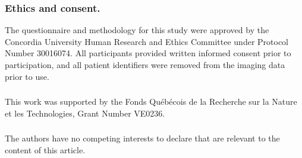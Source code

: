 \documentclass[runningheads]{llncs}
\begin{document}
\subsubsection*{Ethics and consent.}
The questionnaire and methodology for this study were approved by the
Concordia University Human Research and Ethics Committee under Protocol
Number 30016074. All participants provided written informed consent prior to
participation, and all patient identifiers were removed from the imaging data
prior to use.

\begin{credits}
\subsubsection{\ackname}
This work was supported by the Fonds Qu\'eb\'ecois de la Recherche sur la
Nature et les Technologies, Grant Number VE0236.

\subsubsection{\discintname}
The authors have no competing interests to declare that are relevant to the
content of this article.
\end{credits}


\end{document}
